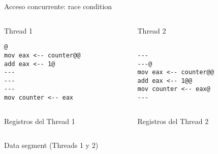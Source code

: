\begin{frame}[fragile]{Acceso concurrente: race condition}
   \begin{columns}
      \begin{column}{.5\linewidth}
          Thread 1
         \begin{lstlisting}[style=dimmided,firstnumber=0]
         @
mov eax <-- counter@@
add eax <-- 1@
---
---
---
mov counter <-- eax
         \end{lstlisting}
      \end{column}
      \begin{column}{.45\linewidth}
          Thread 2
         \begin{lstlisting}[style=dimmided,firstnumber=0]

---
---@
mov eax <-- counter@@
add eax <-- 1@@
mov counter <-- eax@
---
         \end{lstlisting}
      \end{column}
   \end{columns}
    \vspace{1em}
   \begin{columns}
      \begin{column}{.5\linewidth}
          Registros del Thread 1\\
      \end{column}
      \begin{column}{.45\linewidth}
          Registros del Thread 2\\
      \end{column}
   \end{columns}
    \vspace{1.4em}
    \centering
   \begin{columns}
      \begin{column}{.5\linewidth}
          Data segment (Threads 1 y 2)\\
\only<5>{counter = 1}
%
      \end{column}
   \end{columns}
\end{frame}

